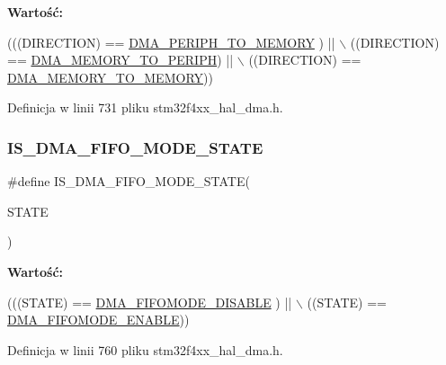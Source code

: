 {\bfseries Wartość\+:}
\begin{DoxyCode}
(((DIRECTION) == \hyperlink{group___d_m_a___data__transfer__direction_gacb2cbf03ecae6804ae4a6f60a3e37c12}{DMA\_PERIPH\_TO\_MEMORY} ) || \(\backslash\)
                                     ((DIRECTION) == \hyperlink{group___d_m_a___data__transfer__direction_ga9e76fc559a2d5c766c969e6e921b1ee9}{DMA\_MEMORY\_TO\_PERIPH})  || \(\backslash\)
                                     ((DIRECTION) == \hyperlink{group___d_m_a___data__transfer__direction_ga0695035d725855ccf64d2d8452a33810}{DMA\_MEMORY\_TO\_MEMORY}))
\end{DoxyCode}


Definicja w linii 731 pliku stm32f4xx\+\_\+hal\+\_\+dma.\+h.

\mbox{\label{group___d_m_a___private___macros_gadb90a893aeb49fd4bc14af750af3837c}} 
\subsubsection{\texorpdfstring{I\+S\+\_\+\+D\+M\+A\+\_\+\+F\+I\+F\+O\+\_\+\+M\+O\+D\+E\+\_\+\+S\+T\+A\+TE}{IS\_DMA\_FIFO\_MODE\_STATE}}
{\footnotesize\ttfamily \#define I\+S\+\_\+\+D\+M\+A\+\_\+\+F\+I\+F\+O\+\_\+\+M\+O\+D\+E\+\_\+\+S\+T\+A\+TE(\begin{DoxyParamCaption}\item[{}]{S\+T\+A\+TE }\end{DoxyParamCaption})}

{\bfseries Wartość\+:}
\begin{DoxyCode}
(((STATE) == \hyperlink{group___d_m_a___f_i_f_o__direct__mode_gaec22b199f9da9214bf908d7edbcd83e8}{DMA\_FIFOMODE\_DISABLE} ) || \(\backslash\)
                                       ((STATE) == \hyperlink{group___d_m_a___f_i_f_o__direct__mode_ga18709570bed6b9112520701c482fbe4b}{DMA\_FIFOMODE\_ENABLE}))
\end{DoxyCode}


Definicja w linii 760 pliku stm32f4xx\+\_\+hal\+\_\+dma.\+h.

\mbox{\label{group___d_m_a___private___macros_gaeafc0d9e327d6e5b26cd37f6744b232f}} 
